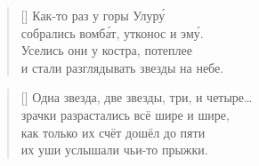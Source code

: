 \documentclass[a5paper,11pt]{memoir}
\begin{document}
\BgThispage

{}
\settowidth{\versewidth}{Серый кот - господин Мыцумото.}
\begin{verse}[\versewidth]
Как-то раз у горы Улур\'{у}\\
собрались вомб\'{а}т, утконос и эм\'{у}.\\
Уселись они у костра, потеплее\\
и стали разглядывать звезды на небе.
\end{verse}
\label{milky-way}


\begin{verse}[\versewidth]
\hspace{10mm}Одна звезда, две звезды, три, и четыре\ldots\\
\hspace{10mm}зрачки разрастались всё шире и шире,\\
\hspace{10mm}как только их счёт дошёл до пяти\\
\hspace{10mm}их уши услышали чьи-то прыжки.
\end{verse}
\end{document}
